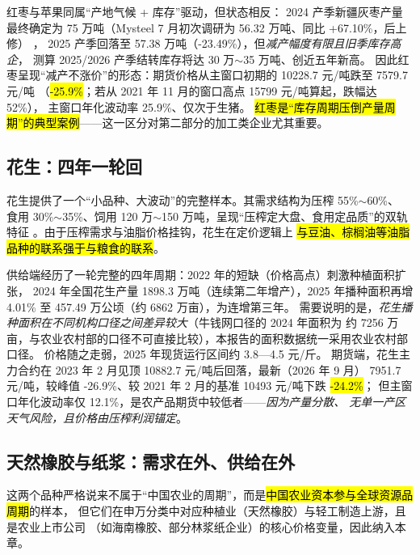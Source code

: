 红枣与苹果同属“产地气候 + 库存”驱动，但状态相反：
2024 产季新疆灰枣产量最终确定为 75 万吨（Mysteel 7 月初次调研为 56.32 万吨、同比 +67.10\%，后上修）
\cite{mysteel2025jujube,qhrb2026jujube}，
2025 产季回落至 57.38 万吨（-23.49\%），但\emph{减产幅度有限且旧季库存高企}，
测算 2025/2026 产季结转库存将达 30 万$\sim$35 万吨、创近五年新高\cite{qhrb2026jujube}。
因此红枣呈现“减产不涨价”的形态：期货价格从主窗口初期的 \num{10228.7} 元/吨跌至 \num{7579.7} 元/吨
（\hl{-25.9\%}；若从 2021 年 11 月的窗口高点 \num{15799} 元/吨算起，跌幅达 52\%），
主窗口年化波动率 25.9\%、仅次于生猪。
\hl{红枣是“库存周期压倒产量周期”的典型案例}——这一区分对第二部分的加工类企业尤其重要。

\subsection{花生：四年一轮回}
\label{sec:soft-peanut}

花生提供了一个“小品种、大波动”的完整样本。其需求结构为压榨 55\%$\sim$60\%、
食用 30\%$\sim$35\%、饲用 120 万$\sim$150 万吨，呈现“压榨定大盘、食用定品质”的双轨特征
\cite{nqw2026peanut}。由于压榨需求与油脂价格挂钩，花生在定价逻辑上
\hl{与豆油、棕榈油等油脂品种的联系强于与粮食的联系}。

供给端经历了一轮完整的四年周期：2022 年的短缺（价格高点）刺激种植面积扩张，
2024 年全国花生产量 1898.3 万吨（连续第二年增产），2025 年播种面积再增 4.01\% 至
457.49 万公顷（约 6862 万亩），为连增第三年\cite{nqw2026peanut}。
需要说明的是，\emph{花生播种面积在不同机构口径之间差异较大}（牛钱网口径的 2024 年面积为
约 7256 万亩，与农业农村部的口径不可直接比较），本报告的面积数据统一采用农业农村部口径。
价格随之走弱，2025 年现货运行区间约 3.8---4.5 元/斤\cite{nqw2026peanut}。
期货端，花生主力合约在 2023 年 2 月见顶 \num{10882.7} 元/吨后回落，最新（2026 年 9 月）
\num{7951.7} 元/吨，较峰值 -26.9\%、较 2021 年 2 月的基准 \num{10493} 元/吨下跌 \hl{-24.2\%}；
但主窗口年化波动率仅 12.1\%，是农产品期货中较低者——\emph{因为产量分散、
无单一产区天气风险，且价格由压榨利润锚定}。

\subsection{天然橡胶与纸浆：需求在外、供给在外}
\label{sec:soft-rubber}

这两个品种严格说来不属于“中国农业的周期”，而是\hl{中国农业资本参与全球资源品周期}的样本，
但它们在申万分类中对应种植业（天然橡胶）与轻工制造上游，且是农业上市公司
（如海南橡胶、部分林浆纸企业）的核心价格变量，因此纳入本章。

